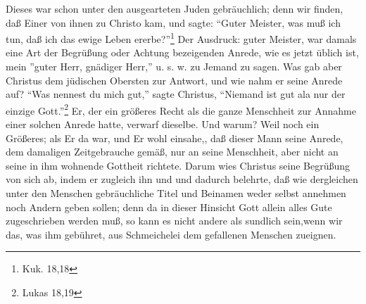 Dieses war schon unter den ausgearteten Juden gebräuchlich; denn wir finden, daß
Einer von ihnen zu Christo kam, und sagte: "`Guter Meister, was muß ich tun,
daß ich das ewige Leben ererbe?"'\footnote{Kuk. 18,18} Der Ausdruck: guter
Meister, war damals eine Art der Begrüßung oder Achtung bezeigenden Anrede, wie
es jetzt üblich ist, mein ''guter Herr, gnädiger Herr,'' u. s. w. zu Jemand zu
sagen. Was gab aber Christus dem jüdischen Obersten zur Antwort, und wie nahm er
seine Anrede auf? "`Was nennest du mich gut,"' sagte Christus, "`Niemand ist gut
ala nur der einzige Gott."'\footnote{Lukas 18,19} Er, der ein größeres Recht als
die ganze Menschheit zur Annahme einer solchen Anrede hatte, verwarf dieselbe.
Und warum? Weil noch ein Größeres; als Er da war, und Er wohl einsahe,, daß
dieser Mann seine Anrede, dem damaligen Zeitgebrauche gemäß, nur an seine
Menschheit, aber nicht an seine in ihm wohnende Gottheit richtete. Darum wies
Christus seine Begrüßung von sich ab, indem er zugleich ihn und und dadurch
belehrte, daß wie dergleichen unter den Menschen gebräuchliche Titel und
Beinamen weder selbst annehmen noch Andern geben sollen; denn da in dieser
Hinsicht Gott allein alles Gute zugeschrieben werden muß, so kann es nicht
andere als sundlich sein,wenn wir das, was ihm gebühret, aus Schmeichelei dem
gefallenen Menschen zueignen.

\medskip

